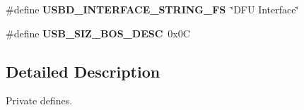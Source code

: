\begin{DoxyCompactItemize}
\item 
\mbox{\label{group__USBD__DESC__Private__Defines_ga2562ccc9162020b79f07d813eba10ddb}} 
\#define {\bfseries U\+S\+B\+D\+\_\+\+I\+N\+T\+E\+R\+F\+A\+C\+E\+\_\+\+S\+T\+R\+I\+N\+G\+\_\+\+FS}~\char`\"{}D\+FU Interface\char`\"{}
\item 
\mbox{\label{group__USBD__DESC__Private__Defines_ga3d6767367e9b15bae8d264a78102aba8}} 
\#define {\bfseries U\+S\+B\+\_\+\+S\+I\+Z\+\_\+\+B\+O\+S\+\_\+\+D\+E\+SC}~0x0C
\end{DoxyCompactItemize}


\subsection{Detailed Description}
Private defines. 

